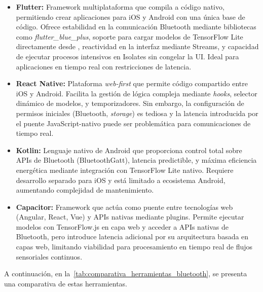 \begin{itemize}
	\item \textbf{Flutter:} Framework multiplataforma que compila a código nativo, permitiendo crear aplicaciones para iOS y Android con una única base de código. Ofrece estabilidad en la comunicación Bluetooth mediante bibliotecas como \textit{flutter\_blue\_plus}, soporte para cargar modelos de TensorFlow Lite directamente desde , reactividad en la interfaz mediante Streams, y capacidad de ejecutar procesos intensivos en Isolates sin congelar la UI\@. Ideal para aplicaciones en tiempo real con restricciones de latencia.
	
	\item \textbf{React Native:} Plataforma \textit{web-first} que permite código compartido entre iOS y Android. Facilita la gestión de lógica compleja mediante \textit{hooks}, selector dinámico de modelos, y temporizadores. Sin embargo, la configuración de permisos iniciales (Bluetooth, \textit{storage}) es tediosa y la latencia introducida por el puente JavaScript-nativo puede ser problemática para comunicaciones de tiempo real.
	
	\item \textbf{Kotlin:} Lenguaje nativo de Android que proporciona control total sobre APIs de Bluetooth (BluetoothGatt), latencia predictible, y máxima eficiencia energética mediante integración con TensorFlow Lite nativo. Requiere desarrollo separado para iOS y está limitado a ecosistema Android, aumentando complejidad de mantenimiento.
	
	\item \textbf{Capacitor:} Framework que actúa como puente entre tecnologías web (Angular, React, Vue) y APIs nativas mediante plugins. Permite ejecutar modelos con TensorFlow.js en capa web y acceder a APIs nativas de Bluetooth, pero introduce latencia adicional por su arquitectura basada en capas web, limitando viabilidad para procesamiento en tiempo real de flujos sensoriales continuos.
\end{itemize}

A continuación, en la~\autoref{tab:comparativa_herramientas_bluetooth}, se presenta una comparativa de estas herramientas.

